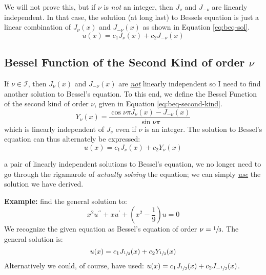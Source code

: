 We will not prove this, but if $\nu$ is \emph{not} an integer, then $J_{\nu}$ and $J_{-\nu}$ are linearly independent. In that case, the solution (at long last) to Bessels equation is just a linear combination of $J_{\nu}(x)$ and $J_{-\nu}(x)$ as shown in Equation \ref{eq:beq-sol}.
\begin{equation}
u(x) = c_1J_{\nu}(x) + c_2J_{-\nu}(x)
\label{eq:beq-sol}
\end{equation}

\subsection{Bessel Function of the Second Kind of order $\nu$}
If $\nu \in \mathcal{I}$, then $J_{\nu}(x)$ and $J_{-\nu}(x)$ are \emph{\underline{not}} linearly independent so I need to find another solution to Bessel's equation.  To this end, we define the Bessel Function of the second kind of order $\nu$, given in Equation \ref{eq:beq-second-kind}.
\begin{equation}
Y_{\nu}(x) = \frac{\cos{\nu \pi} J_{\nu}(x) - J_{-\nu}(x)}{\sin{\nu \pi}}
\label{eq:beq-second-kind}
\end{equation}
which is linearly independent of $J_{\nu}$ even if $\nu$ is an integer.  The solution to Bessel's equation can thus alternately be expressed:
\begin{equation*}
u(x) = c_1J_{\nu}(x) + c_2Y_{\nu}(x)
\end{equation*}

 a pair of linearly independent solutions to Bessel's equation, we no longer need to go through the rigamarole of \emph{actually solving} the equation; we can simply \emph{\underline{use}} the solution we have derived.

\vspace{1.0cm}

\noindent\textbf{Example:} find the general solution to:
\begin{equation*}
x^2u^{\prime \prime} + xu^{\prime} + \left(x^2 - \frac{1}{9} \right)u = 0
\end{equation*}
We recognize the given equation as Bessel's equation of order $\nu = \sfrac{1}{3}$.  The general solution is: 
\begin{equation*}
u(x) = c_1J_{\sfrac{1}{3}}(x) + c_2Y_{\sfrac{1}{3}}(x)
\end{equation*}
Alternatively we could, of course, have used: $u(x) = c_1J_{\sfrac{1}{3}}(x) + c_2J_{-\sfrac{1}{3}}(x)$.

